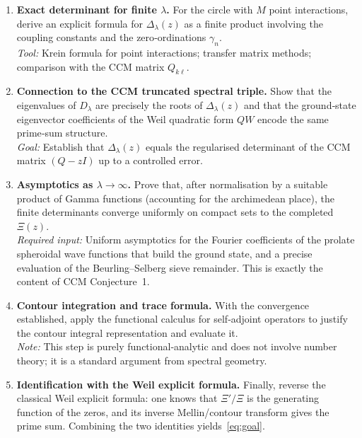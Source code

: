 \documentclass[12pt,a4paper]{article}
\begin{document}
\begin{enumerate}
\item \textbf{Exact determinant for finite \(\lambda\).}  
  For the circle with \(M\) point interactions, derive an explicit formula for \(\Delta_\lambda(z)\) as a finite product involving the coupling constants and the zero‑ordinations \(\gamma_n\).  
  \\
  \textit{Tool:} Krein formula for point interactions; transfer matrix methods; comparison with the CCM matrix \(Q_{k\ell}\).

\item \textbf{Connection to the CCM truncated spectral triple.}  
  Show that the eigenvalues of \(D_\lambda\) are precisely the roots of \(\Delta_\lambda(z)\) and that the ground‑state eigenvector coefficients of the Weil quadratic form \(QW\) encode the same prime‑sum structure.  
  \\
  \textit{Goal:} Establish that \(\Delta_\lambda(z)\) equals the regularised determinant of the CCM matrix \((Q - zI)\) up to a controlled error.

\item \textbf{Asymptotics as \(\lambda \to \infty\).}  
  Prove that, after normalisation by a suitable product of Gamma functions (accounting for the archimedean place), the finite determinants converge uniformly on compact sets to the completed \(\Xi(z)\).  
  \\
  \textit{Required input:} Uniform asymptotics for the Fourier coefficients of the prolate spheroidal wave functions that build the ground state, and a precise evaluation of the Beurling–Selberg sieve remainder. This is exactly the content of CCM Conjecture~1.

\item \textbf{Contour integration and trace formula.}  
  With the convergence established, apply the functional calculus for self‑adjoint operators to justify the contour integral representation and evaluate it.
  \\
  \textit{Note:} This step is purely functional‑analytic and does not involve number theory; it is a standard argument from spectral geometry.

\item \textbf{Identification with the Weil explicit formula.}  
  Finally, reverse the classical Weil explicit formula: one knows that \(\Xi'/ \Xi\) is the generating function of the zeros, and its inverse Mellin/contour transform gives the prime sum.  Combining the two identities yields~\eqref{eq:goal}.
\end{enumerate}
\end{document}
